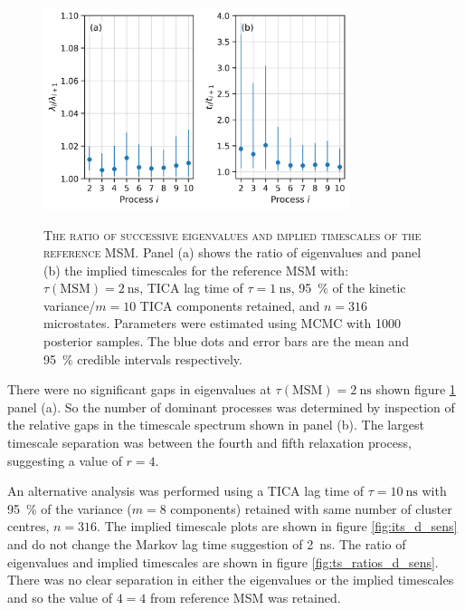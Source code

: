 \begin{figure}
    \centering
    \caption[The ratio of successive eigenvalues and implied timescales of the reference MSM]{\textsc{The ratio of successive eigenvalues and implied timescales of the reference MSM}. Panel (a) shows the ratio of eigenvalues and panel (b) the implied timescales for the reference MSM with: $\tau(\textrm{MSM})=\SI{2}{\nano\second}$, TICA lag time of $\tau=\SI{1}{\nano\second}$, \SI{95}{\percent} of the kinetic variance/$m=10$ TICA components retained, and $n=316$ microstates. Parameters were estimated using MCMC with \num{1000} posterior samples. The blue dots and error bars are the mean and \SI{95}{\percent} credible intervals respectively.}
    \includegraphics[width=0.8\textwidth]{chapters/aadh/figures/timescale_ratios_D.png}
    \label{fig:ts_ratios_d}
\end{figure}

There were no significant gaps in eigenvalues at $\tau(\mathrm{MSM})=\SI{2}{\nano\second}$  shown figure \ref{fig:ts_ratios_d} panel (a). So the number of dominant processes was determined by inspection of the relative gaps in the timescale spectrum shown in  panel (b). The largest timescale separation was between the fourth and fifth relaxation process, suggesting a value of $r=4$. 

An alternative analysis was performed using a TICA lag time of $\tau=\SI{10}{\nano\second}$ with \SI{95}{\percent} of the variance ($m=8$ components) retained with same number of cluster centres, $n=316$. The implied timescale plots are shown in figure \ref{fig:its_d_sens} and  do not change the Markov lag time suggestion of \SI{2}{\nano\second}. The ratio of eigenvalues and implied timescales  are shown in figure \ref{fig:ts_ratios_d_sens}. There was no clear separation in either the eigenvalues or the implied timescales and so the value of $4=4$ from reference MSM was retained.

